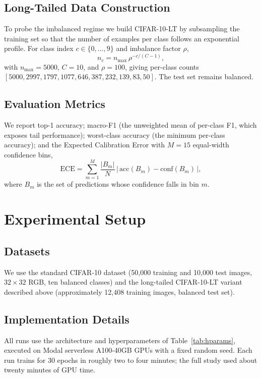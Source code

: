 \documentclass[conference]{IEEEtran}
\begin{document}
\subsection{Long-Tailed Data Construction}
To probe the imbalanced regime we build CIFAR-10-LT by subsampling the training set so that the
number of examples per class follows an exponential profile. For class index
$c \in \{0,\dots,9\}$ and imbalance factor $\rho$,
\begin{equation}
n_c = n_{\max}\,\rho^{-c/(C-1)},
\end{equation}
with $n_{\max} = 5000$, $C = 10$, and $\rho = 100$, giving per-class counts
$[5000, 2997, 1797, 1077, 646, 387, 232, 139, 83, 50]$. The test set remains balanced.

\subsection{Evaluation Metrics}
We report top-1 accuracy; macro-F1 (the unweighted mean of per-class F1, which exposes tail
performance); worst-class accuracy (the minimum per-class accuracy); and the Expected
Calibration Error with $M=15$ equal-width confidence bins,
\begin{equation}
\mathrm{ECE} = \sum_{m=1}^{M} \frac{|B_m|}{N}\,\bigl|\,\mathrm{acc}(B_m) - \mathrm{conf}(B_m)\,\bigr|,
\end{equation}
where $B_m$ is the set of predictions whose confidence falls in bin $m$.

\section{Experimental Setup}
\label{sec:setup}

\subsection{Datasets}
We use the standard CIFAR-10 dataset (50{,}000 training and 10{,}000 test images, $32\times32$
RGB, ten balanced classes) and the long-tailed CIFAR-10-LT variant described above
(approximately 12{,}408 training images, balanced test set).

\subsection{Implementation Details}
All runs use the architecture and hyperparameters of Table~\ref{tab:hparams}, executed on Modal
serverless A100-40GB GPUs with a fixed random seed. Each run trains for 30 epochs in roughly two
to four minutes; the full study used about twenty minutes of GPU time.
\end{document}
